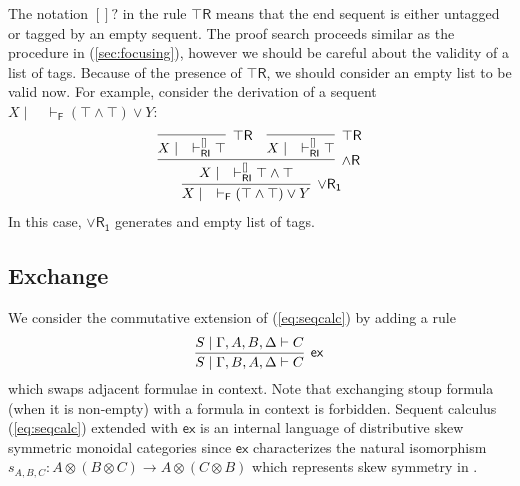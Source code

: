 \documentclass[submission,copyright,creativecommons]{eptcs}
\theoremstyle{definition}
\newcommand{\andr}{\land \mathsf{R}}
\newcommand{\orrone}{\lor \mathsf{R_{1}}}
\newcommand{\ot}{\otimes}
\newcommand{\RI}{\mathsf{RI}}
\newcommand{\F}{\mathsf{F}}
\newcommand{\ex}{\mathsf{ex}}
\newcommand{\topr}{\top \mathsf{R}}
\begin{document}
The notation $[]?$ in the rule $\topr$ means that the end sequent is either untagged or tagged by an empty sequent.
The proof search proceeds similar as the procedure in (\ref{sec:focusing}), however we should be careful about the validity of a list of tags.
Because of the presence of $\topr$, we should consider an empty list to be valid now.
For example, consider the derivation of a sequent $X \mid \quad \vdash_{\F} (\top \land \top) \lor Y$:
\begin{displaymath}
  \begin{array}{c}
    \infer[\orrone]{X \mid \quad \vdash_{\F} (\top \land \top) \lor Y}{
      \infer[\andr]{X \mid \quad \vdash^{[]}_{\RI} \top \land \top}{
        \infer[\topr]{X \mid \quad \vdash^{[]}_{\RI} \top}{}
        &
        \infer[\topr]{X \mid \quad \vdash^{[]}_{\RI} \top}{}
      }
    }
  \end{array}
\end{displaymath}
In this case, $\orrone$ generates and empty list of tags.

\subsection{Exchange}\label{subsec:Ex}
We consider the commutative extension of (\ref{eq:seqcalc}) by adding a rule 
\begin{displaymath}
  \infer[\ex]{S \mid \Gamma , B , A , \Delta \vdash C}{
    S \mid \Gamma , A , B , \Delta \vdash C
  }
\end{displaymath}
which swaps adjacent formulae in context.
Note that exchanging stoup formula (when it is non-empty) with a formula in context is forbidden.
Sequent calculus (\ref{eq:seqcalc}) extended with $\ex$ is an internal language of distributive skew symmetric monoidal categories since $\ex$ characterizes the natural isomorphism $s_{A , B , C} : A \ot (B \ot C) \to A \ot (C \ot B)$ which represents skew symmetry in \cite{bourke:lack:braided:2020}.
\end{document}
